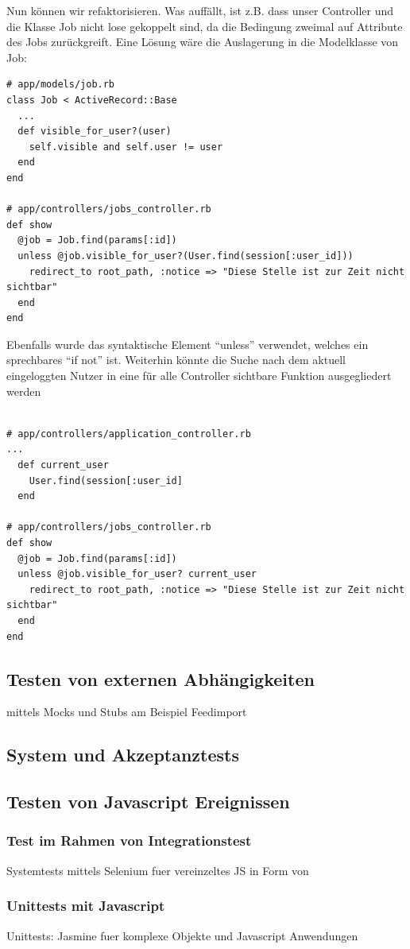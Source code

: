 Nun können wir refaktorisieren. Was auffällt, ist z.B. dass unser Controller und die Klasse Job nicht lose gekoppelt sind, da die Bedingung zweimal auf Attribute des Jobs zurückgreift. Eine Lösung wäre die Auslagerung in die Modelklasse von Job:
\begin{lstlisting}
# app/models/job.rb
class Job < ActiveRecord::Base
  ...
  def visible_for_user?(user)
    self.visible and self.user != user
  end 
end

# app/controllers/jobs_controller.rb 
def show
  @job = Job.find(params[:id])
  unless @job.visible_for_user?(User.find(session[:user_id]))
    redirect_to root_path, :notice => "Diese Stelle ist zur Zeit nicht sichtbar"
  end
end
\end{lstlisting}
Ebenfalls wurde das syntaktische Element "`unless"' verwendet, welches ein sprechbares "`if not"' ist.
Weiterhin könnte die Suche nach dem aktuell eingeloggten Nutzer in eine für alle Controller sichtbare Funktion ausgegliedert werden

\begin{lstlisting}

# app/controllers/application_controller.rb
...
  def current_user
    User.find(session[:user_id]
  end

# app/controllers/jobs_controller.rb 
def show
  @job = Job.find(params[:id])
  unless @job.visible_for_user? current_user
    redirect_to root_path, :notice => "Diese Stelle ist zur Zeit nicht sichtbar"
  end
end
\end{lstlisting}



\subsection{Testen von externen Abhängigkeiten}
 mittels Mocks und Stubs am Beispiel Feedimport

\subsection{System und Akzeptanztests}


\subsection{Testen von Javascript Ereignissen}
\subsubsection{Test im Rahmen von Integrationstest}
Systemtests mittels Selenium fuer vereinzeltes JS in Form von

\subsubsection{Unittests mit Javascript}
Unittests:  Jasmine fuer komplexe Objekte und Javascript Anwendungen






